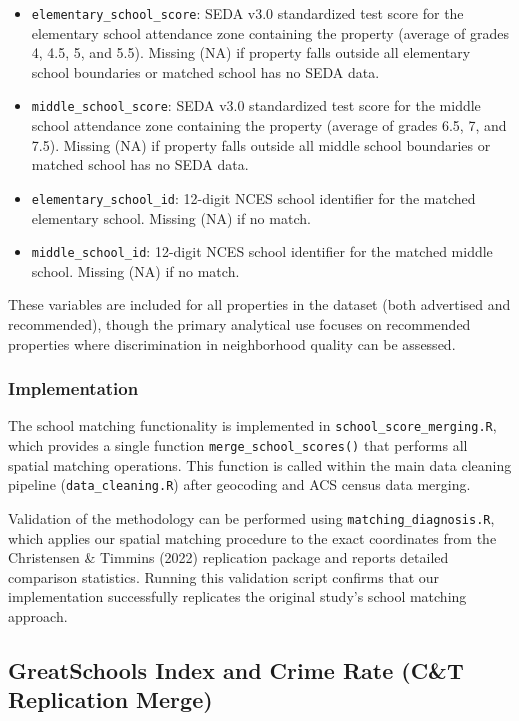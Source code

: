 \documentclass{article}
\begin{document}
\begin{itemize}
\item \texttt{elementary\_school\_score}: SEDA v3.0 standardized test score for the elementary school attendance zone containing the property (average of grades 4, 4.5, 5, and 5.5). Missing (NA) if property falls outside all elementary school boundaries or matched school has no SEDA data.
\item \texttt{middle\_school\_score}: SEDA v3.0 standardized test score for the middle school attendance zone containing the property (average of grades 6.5, 7, and 7.5). Missing (NA) if property falls outside all middle school boundaries or matched school has no SEDA data.
\item \texttt{elementary\_school\_id}: 12-digit NCES school identifier for the matched elementary school. Missing (NA) if no match.
\item \texttt{middle\_school\_id}: 12-digit NCES school identifier for the matched middle school. Missing (NA) if no match.
\end{itemize}

These variables are included for all properties in the dataset (both advertised and recommended), though the primary analytical use focuses on recommended properties where discrimination in neighborhood quality can be assessed.

\subsubsection{Implementation}

The school matching functionality is implemented in \texttt{school\_score\_merging.R}, which provides a single function \texttt{merge\_school\_scores()} that performs all spatial matching operations. This function is called within the main data cleaning pipeline (\texttt{data\_cleaning.R}) after geocoding and ACS census data merging.

Validation of the methodology can be performed using \texttt{matching\_diagnosis.R}, which applies our spatial matching procedure to the exact coordinates from the Christensen \& Timmins (2022) replication package and reports detailed comparison statistics. Running this validation script confirms that our implementation successfully replicates the original study's school matching approach.

\subsection{GreatSchools Index and Crime Rate (C\&T Replication Merge)}
\end{document}

